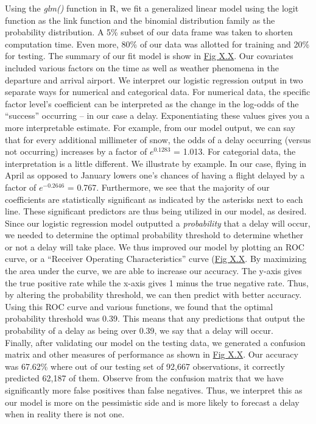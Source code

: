 \documentclass[12pt, a4paper, openany]{book}
\newcommand\tab[1][1cm]{\hspace*{#1}}
\begin{document}
	\tab Using the \textit{glm()} function in R, we fit a generalized linear model using the logit function as the link function and the binomial distribution family as the probability distribution. A 5\% subset of our data frame was taken to shorten computation time. Even more, 80\% of our data was allotted for training and 20\% for testing. The summary of our fit model is show in \underline{Fig X.X}. Our covariates included various factors on the time as well as weather phenomena in the departure and arrival airport. We interpret our logistic regression output in two separate ways for numerical and categorical data. For numerical data, the specific factor level’s coefficient can be interpreted as the change in the log-odds of the “success” occurring – in our case a delay. Exponentiating these values gives you a more interpretable estimate. For example, from our model output, we can say that for every additional millimeter of snow, the odds of a delay occurring (versus not occurring) increases by a factor of $e^{0.1283}$ = 1.013. For categorial data, the interpretation is a little different. We illustrate by example. In our case, flying in April as opposed to January lowers one’s chances of having a flight delayed by a factor of $e^{-0.2646}$ = 0.767. Furthermore, we see that the majority of our coefficients are statistically significant as indicated by the asterisks next to each line. These significant predictors are thus being utilized in our model, as desired. \\
	\tab Since our logistic regression model outputted a \textit{probability} that a delay will occur, we needed to determine the optimal probability threshold to determine whether or not a delay will take place. We thus improved our model by plotting an ROC curve, or a “Receiver Operating Characteristics” curve (\underline{Fig X.X}. By maximizing the area under the curve, we are able to increase our accuracy. The y-axis gives the true positive rate while the x-axis gives 1 minus the true negative rate. Thus, by altering the probability threshold, we can then predict with better accuracy. Using this ROC curve and various functions, we found that the optimal probability threshold was 0.39. This means that any predictions that output the probability of a delay as being over 0.39, we say that a delay will occur. \\
	\tab Finally, after validating our model on the testing data, we generated a confusion matrix and other measures of performance as shown in \underline{Fig X.X}. Our accuracy was 67.62\% where out of our testing set of 92,667 observations, it correctly predicted 62,187 of them. Observe from the confusion matrix that we have significantly more false positives than false negatives. Thus, we interpret this as our model is more on the pessimistic side and is more likely to forecast a delay when in reality there is not one. \\
\end{document}
